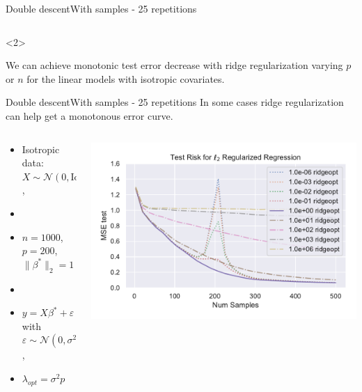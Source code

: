 \documentclass[10pt,aspectratio=43]{beamer}
\begin{document}
\begin{frame}{Double descent}{With samples \citep{nakkiran2020optimal} - 25 repetitions}
\begin{columns}
\begin{column}{0.7\textwidth}
\begin{center}
             \end{center}
        \end{column}
        \end{columns}
    \begin{onlyenv}<2>
        \begin{block}{}
        We can achieve monotonic test error decrease with ridge regularization varying $p$ or $n$ for the linear models with isotropic covariates.
        \end{block}
    \end{onlyenv}
\end{frame}

\begin{frame}{Double descent}{With samples \citep{nakkiran2020optimal} - 25 repetitions}
    In some cases ridge regularization can help get a monotonous error curve.
    \begin{columns}
        \begin{column}{0.46\textwidth}
            \begin{itemize}
                \item Isotropic data: $X\sim\mathcal{N}(0,\mathrm{Id})$,
                \item[]
                \item $n=1000$, $p=200$, $\|\beta^*\|_2=1$
                \item[]
                \item $y = X\beta^*+\varepsilon$ with $\varepsilon\sim \mathcal{N}(0, \sigma^2\mathrm{Id})$,
                \item $\lambda_{opt} = \sigma^2p$
            \end{itemize}
        \end{column}
        \begin{column}{0.7\textwidth}
            \begin{center}
             \includegraphics[width=1\textwidth]{double_descent_sup.pdf}

\end{center}
\end{column}
\end{columns}
\end{frame}
\end{document}
